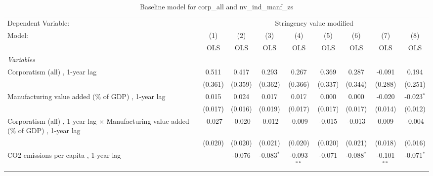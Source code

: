 
\begin{table}[htbp]
   \caption{Baseline model for corp\_all and nv\_ind\_manf\_zs}
   \centering
   \begin{tabular}{lcccccccc}
      \toprule
      Dependent Variable: & \multicolumn{8}{c}{Stringency value modified}\\
      Model:                                                                                       & (1)     & (2)     & (3)          & (4)           & (5)           & (6)           & (7)           & (8)\\  
                                                                                                   &  OLS    & OLS     & OLS          & OLS           & OLS           & OLS           & OLS           & OLS\\  
      \midrule
      \emph{Variables}\\
      Corporatism (all) , 1-year lag                                                               & 0.511   & 0.417   & 0.293        & 0.267         & 0.369         & 0.287         & -0.091        & 0.194\\   
                                                                                                   & (0.361) & (0.359) & (0.362)      & (0.366)       & (0.337)       & (0.344)       & (0.288)       & (0.251)\\   
      Manufacturing value added (\% of GDP) , 1-year lag                                           & 0.015   & 0.024   & 0.017        & 0.017         & 0.000         & 0.000         & -0.020        & -0.023$^{*}$\\   
                                                                                                   & (0.017) & (0.016) & (0.019)      & (0.017)       & (0.017)       & (0.017)       & (0.014)       & (0.012)\\   
      Corporatism (all) , 1-year lag $\times$ Manufacturing value added (\% of GDP) , 1-year lag   & -0.027  & -0.020  & -0.012       & -0.009        & -0.015        & -0.013        & 0.009         & -0.004\\   
                                                                                                   & (0.020) & (0.020) & (0.021)      & (0.020)       & (0.020)       & (0.021)       & (0.018)       & (0.016)\\   
      CO2 emissions per capita , 1-year lag                                                        &         & -0.076  & -0.083$^{*}$ & -0.093$^{**}$ & -0.071        & -0.088$^{*}$  & -0.101$^{**}$ & -0.071$^{*}$\\   

\end{tabular}
\end{table}
